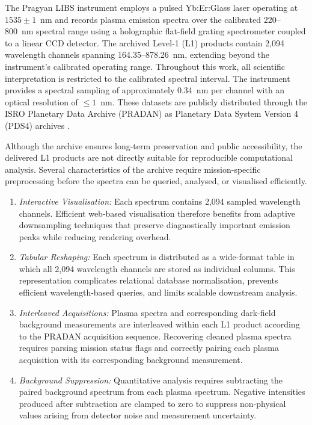 \documentclass[final,5p,twocolumn,a4paper]{elsarticle}
\begin{document}
The Pragyan LIBS instrument employs a pulsed Yb:Er:Glass laser operating at $1535 \pm 1$~nm and records plasma emission spectra over the calibrated 220--800~nm spectral range using a holographic flat-field grating spectrometer coupled to a linear CCD detector. The archived Level-1 (L1) products contain 2,094 wavelength channels spanning 164.35--878.26~nm, extending beyond the instrument's calibrated operating range. Throughout this work, all scientific interpretation is restricted to the calibrated spectral interval. The instrument provides a spectral sampling of approximately 0.34~nm per channel with an optical resolution of $\le 1$~nm. These datasets are publicly distributed through the ISRO Planetary Data Archive (PRADAN) as Planetary Data System Version 4 (PDS4) archives \cite{isro_chandrayaan3_libs, pds4_standard}.

Although the archive ensures long-term preservation and public accessibility, the delivered L1 products are not directly suitable for reproducible computational analysis. Several characteristics of the archive require mission-specific preprocessing before the spectra can be queried, analysed, or visualised efficiently.
\begin{enumerate}
    \item \emph{Interactive Visualisation:} Each spectrum contains 2,094 sampled wavelength channels. Efficient web-based visualisation therefore benefits from adaptive downsampling techniques that preserve diagnostically important emission peaks while reducing rendering overhead.
    \item \emph{Tabular Reshaping:} Each spectrum is distributed as a wide-format table in which all 2,094 wavelength channels are stored as individual columns. This representation complicates relational database normalisation, prevents efficient wavelength-based queries, and limits scalable downstream analysis.
    \item \emph{Interleaved Acquisitions:} Plasma spectra and corresponding dark-field background measurements are interleaved within each L1 product according to the PRADAN acquisition sequence. Recovering cleaned plasma spectra requires parsing mission status flags and correctly pairing each plasma acquisition with its corresponding background measurement.
    \item \emph{Background Suppression:} Quantitative analysis requires subtracting the paired background spectrum from each plasma spectrum. Negative intensities produced after subtraction are clamped to zero to suppress non-physical values arising from detector noise and measurement uncertainty.
\end{enumerate}
\end{document}
